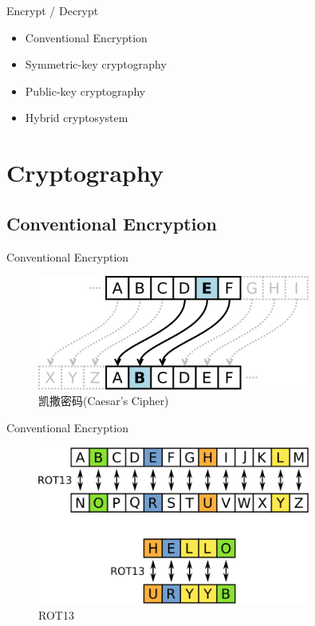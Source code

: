 \documentclass[UTF8]{ctexbeamer}
\begin{document}
\begin{frame}{Encrypt / Decrypt}
    \begin{itemize}
        \item Conventional Encryption
        \item Symmetric-key cryptography
        \item Public-key cryptography
        \item Hybrid cryptosystem
    \end{itemize}
\end{frame}

\section{Cryptography}
\subsection{Conventional Encryption}
\begin{frame}{Conventional Encryption}
    \begin{figure}
        \centering
        \includegraphics[width=0.8\textwidth]{caesar-cipher.png}
        \caption{凯撒密码(Caesar's Cipher)}
    \end{figure}
\end{frame}
\begin{frame}{Conventional Encryption}
    \begin{figure}
        \centering
        \includegraphics[width=0.8\textwidth]{rot13.png}
        \caption{ROT13}
    \end{figure}
\end{frame}
\end{document}
